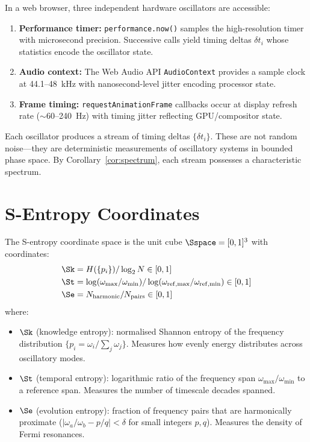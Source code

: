 In a web browser, three independent hardware oscillators are accessible:

\begin{definition}
\label{def:oscillators}
\begin{enumerate}
    \item \textbf{Performance timer:} \texttt{performance.now()} samples the high-resolution timer with microsecond precision. Successive calls yield timing deltas $\delta t_i$ whose statistics encode the oscillator state.
    \item \textbf{Audio context:} The Web Audio API \texttt{AudioContext} provides a sample clock at 44.1--48~kHz with nanosecond-level jitter encoding processor state.
    \item \textbf{Frame timing:} \texttt{requestAnimationFrame} callbacks occur at display refresh rate ($\sim$60--240~Hz) with timing jitter reflecting GPU/compositor state.
\end{enumerate}
\end{definition}

Each oscillator produces a stream of timing deltas $\{\delta t_i\}$. These are not random noise---they are deterministic measurements of oscillatory systems in bounded phase space. By Corollary~\ref{cor:spectrum}, each stream possesses a characteristic spectrum.

\section{S-Entropy Coordinates}
\label{sec:s_coords}

\begin{definition}
\label{def:s_coords}
The S-entropy coordinate space is the unit cube $\Sspace = [0,1]^3$ with coordinates:
\begin{align}
    \Sk &= H(\{p_i\}) / \log_2 N \in [0,1] \label{eq:sk} \\
    \St &= \log(\omega_{\max}/\omega_{\min}) / \log(\omega_{\mathrm{ref,max}}/\omega_{\mathrm{ref,min}}) \in [0,1] \label{eq:st} \\
    \Se &= N_{\mathrm{harmonic}} / N_{\mathrm{pairs}} \in [0,1] \label{eq:se}
\end{align}
where:
\begin{itemize}
    \item $\Sk$ (knowledge entropy): normalised Shannon entropy of the frequency distribution $\{p_i = \omega_i / \sum_j \omega_j\}$. Measures how evenly energy distributes across oscillatory modes.
    \item $\St$ (temporal entropy): logarithmic ratio of the frequency span $\omega_{\max}/\omega_{\min}$ to a reference span. Measures the number of timescale decades spanned.
    \item $\Se$ (evolution entropy): fraction of frequency pairs that are harmonically proximate ($|\omega_a/\omega_b - p/q| < \delta$ for small integers $p, q$). Measures the density of Fermi resonances.
\end{itemize}
\end{definition}

